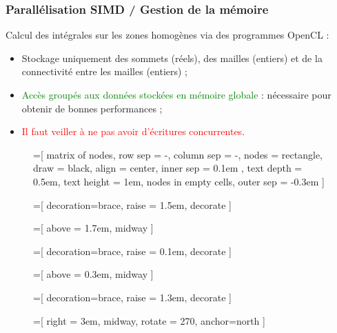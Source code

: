 \begin{frame}
\frametitle{Parallélisation SIMD / Gestion de la mémoire}
\vfill
Calcul des intégrales sur les zones homogènes via des programmes OpenCL :
\begin{itemize}
\item Stockage uniquement des sommets (réels), des mailles (entiers) et de la connectivité entre les mailles (entiers) ;
\item \textcolor{green}{Accès groupés aux données stockées en mémoire globale} : nécessaire pour obtenir de bonnes performances ;
\item \textcolor{red}{Il faut veiller à ne pas avoir d'écritures concurrentes}.
\end{itemize}
\vfill
\begin{figure}
\centering
		=[
			matrix of nodes,
			row sep = -\pgflinewidth,
			column sep = -\pgflinewidth,
			nodes = {
				rectangle,
				draw = black,
				align = center,
				inner sep = 0.1em
			},
			text depth = 0.5em,
			text height = 1em,
			nodes in empty cells,
			outer sep = -0.3em
		]
		
		=[
			decoration={brace, raise = 1.5em}, decorate
		]
		
		=[
			above = 1.7em, midway
		]
		
		=[
			decoration={brace, raise = 0.1em}, decorate
		]
		
		=[
			above = 0.3em, midway
		]
		
		=[
			decoration={brace, raise = 1.3em}, decorate
		]
		
		=[
			right = 3em, midway, rotate = 270, anchor=north
		]
		
\end{figure}
\end{frame}
